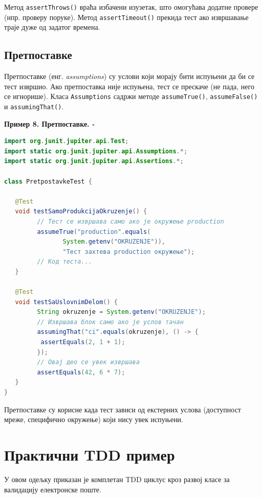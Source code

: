 Метод \texttt{assertThrows()} враћа избачени изузетак, што омогућава додатне провере (нпр. проверу поруке). Метод \texttt{assertTimeout()} прекида тест ако извршавање траје дуже од задатог времена.


\subsection{Претпоставке}

Претпоставке (енг. \textit{assumptions}) су услови који морају бити испуњени да би се тест извршио. Ако претпоставка није испуњена, тест се прескаче (не пада, него се игнорише). Класа \texttt{Assumptions} садржи методе \texttt{assumeTrue()}, \texttt{assumeFalse()} и \texttt{assumingThat()}.

\bigskip

\noindent \textbf{Пример 8. Претпоставке. $\square$}

\medskip


\begin{lstlisting}[language=Java]
import org.junit.jupiter.api.Test;
import static org.junit.jupiter.api.Assumptions.*;
import static org.junit.jupiter.api.Assertions.*;
 
class PretpostavkeTest {
 
   @Test
   void testSamoProdukcijaOkruzenje() {
         // Тест се извршава само ако је окружење production
         assumeTrue("production".equals(
                System.getenv("OKRUZENJE")),
                "Тест захтева production окружење");
         // Код теста...
   }
 
   @Test
   void testSaUslovnimDelom() {
         String okruzenje = System.getenv("OKRUZENJE");
         // Извршава блок само ако је услов тачан
         assumingThat("ci".equals(okruzenje), () -> {
          assertEquals(2, 1 + 1);
         });
         // Овај део се увек извршава
         assertEquals(42, 6 * 7);
   }
}
\end{lstlisting}


Претпоставке су корисне када тест зависи од екстерних услова (доступност мреже, специфично окружење) који нису увек испуњени.


\section{Практични TDD пример}

У овом одељку приказан је комплетан TDD циклус кроз развој класе за валидацију електронске поште.


